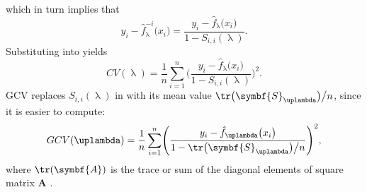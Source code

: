 which in turn implies that
\begin{equation}
  \label{eq:CrossValidationFormalDefinitionOfJackknifedFit3}
  y_i - \hat{f}_\uplambda^{-i}\bigl(x_i\bigr) = \frac{y_i - \hat{f}_\uplambda\bigl(x_i\bigr)}{1 - S_{i, i}(\uplambda)}.
\end{equation}
Substituting  into  yields
\begin{equation}
  \label{eq:CrossValidationSumOfSquares02}
  CV(\uplambda) = \frac{1}{n} \sum_{i = 1}^n\Biggl(\frac{y_i - \hat{f}_\uplambda\bigl(x_i\bigr)}{1 - S_{i, i}(\uplambda)}\Biggr)^2.
\end{equation}
GCV replaces \(S_{i, i}(\uplambda)\) in  with its mean value \(\tr\bigl(\symbf{S}_\uplambda\bigr) \big/ n\), since it is easier to compute:
\begin{equation}
  \label{eq:GeneralizedCrossValidation}
  GCV(\uplambda) = \frac{1}{n} \sum_{i = 1}^n\Biggl(\frac{y_i - \hat{f}_\uplambda\bigl(x_i\bigr)}{1 - \tr\bigl(\symbf{S}_\uplambda\bigr) \big/ n}\Biggr)^2,
\end{equation}
where \(\tr(\symbf{A})\) is the trace or sum of the diagonal elements of square matrix \(\symbf{A}\) \parencite{Hastie1991}.


